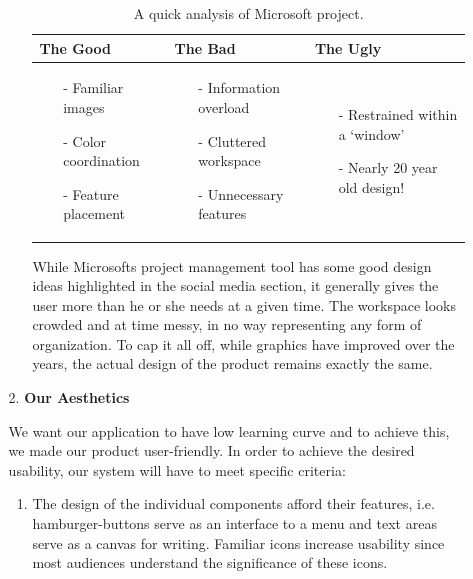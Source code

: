 \begin{enumerate}
\begin{enumerate}
\begin{enumerate}
\begin{table}[ht]
\centering
\begin{tabularx}{\textwidth}{|X|X|X|}
  \hline
  \textbf{The Good} & \textbf{The Bad} & \textbf{The Ugly} \\
  \hline
  \begin{itemize}
    \item[-] Familiar images
    \item[-] Color coordination
    \item[-] Feature placement
  \end{itemize} &
  \begin{itemize}
    \item[-] Information overload
    \item[-] Cluttered workspace
    \item[-] Unnecessary features
  \end{itemize} &
  \begin{itemize}
    \item[-] Restrained within a \textquoteleft{window}\textquoteright
    \item[-] Nearly 20 year old design!
  \end{itemize} \\
  \hline
\end{tabularx}
\caption{A quick analysis of Microsoft project.}
\end{table}
\FloatBarrier
While Microsoft\textsc{}s project management tool has some good design ideas highlighted in the social media section, it generally gives the user more than he or she needs at a given time. The workspace looks crowded and at time messy, in no way representing any form of organization. To cap it all off, while graphics have improved over the years, the actual design of the product remains exactly the same.
\end{enumerate} 
\item[2.] \textbf{Our Aesthetics} 
\par We want our application to have low learning curve and to achieve this, we made our product user-friendly. In order to achieve the desired usability, our system will have to meet specific criteria:
\begin{enumerate}
\item The design of the individual components afford their features, i.e. hamburger-buttons serve as an interface to a menu and text areas serve as a canvas for writing. Familiar icons increase usability since most audiences understand the significance of these icons.

\end{enumerate}
\end{enumerate}
\end{enumerate}
